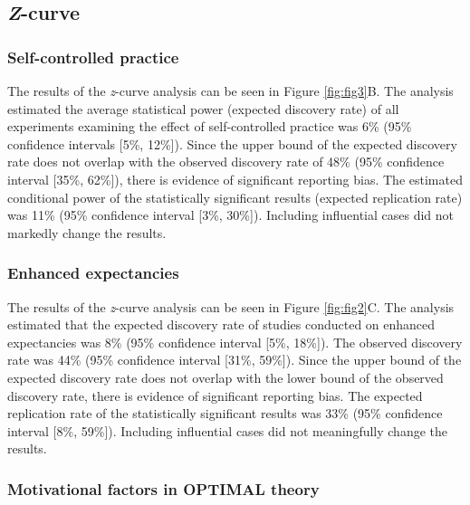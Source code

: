 \documentclass[
  doc, donotrepeattitle,floatsintext]{apa7}
\begin{document}
\clearpage

\normalfont

\hypertarget{z-curve-1}{%
\subsection{\texorpdfstring{\emph{Z}-curve}{Z-curve}}\label{z-curve-1}}

\hypertarget{self-controlled-practice-1}{%
\subsubsection{Self-controlled practice}\label{self-controlled-practice-1}}

The results of the \emph{z}-curve analysis can be seen in Figure \ref{fig:fig3}B. The analysis estimated the average statistical power (expected discovery rate) of all experiments examining the effect of self-controlled practice was 6\% (95\% confidence intervals {[}5\%, 12\%{]}). Since the upper bound of the expected discovery rate does not overlap with the observed discovery rate of 48\% (95\% confidence interval {[}35\%, 62\%{]}), there is evidence of significant reporting bias. The estimated conditional power of the statistically significant results (expected replication rate) was 11\% (95\% confidence interval {[}3\%, 30\%{]}). Including influential cases did not markedly change the results.

\hypertarget{enhanced-expectancies-1}{%
\subsubsection{Enhanced expectancies}\label{enhanced-expectancies-1}}

The results of the \emph{z}-curve analysis can be seen in Figure \ref{fig:fig2}C. The analysis estimated that the expected discovery rate of studies conducted on enhanced expectancies was 8\% (95\% confidence interval {[}5\%, 18\%{]}). The observed discovery rate was 44\% (95\% confidence interval {[}31\%, 59\%{]}). Since the upper bound of the expected discovery rate does not overlap with the lower bound of the observed discovery rate, there is evidence of significant reporting bias. The expected replication rate of the statistically significant results was 33\% (95\% confidence interval {[}8\%, 59\%{]}). Including influential cases did not meaningfully change the results.

\hypertarget{motivational-factors-in-optimal-theory}{%
\subsubsection{Motivational factors in OPTIMAL theory}\label{motivational-factors-in-optimal-theory}}
\end{document}
